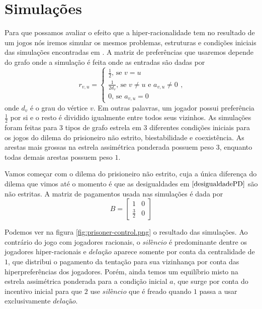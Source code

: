 \chapter{Simulações}

Para que possamos avaliar o efeito que a hiper-racionalidade tem no resultado de um jogos nós iremos simular os mesmos problemas, estruturas e condições iniciais das simulações encontradas em \cite{madeo2015}. A matriz de preferências que usaremos depende do grafo onde a simulação é feita onde as entradas são dadas por
\begin{equation}
    \label{prefComparativo}
    r_{v,u} = \left\{\begin{matrix}
                \frac{1}{2} \text{, se } v=u\\ 
                \frac{1}{2d_v} \text{, se } v\neq u \text{ e } a_{v,u}\neq 0 \\
                 0 \text{, se } a_{v,u}=0
                \end{matrix}\right.,
\end{equation}
onde $d_v$ é o grau do vértice $v$. Em outras palavras, um jogador possui preferência $\frac{1}{2}$ por si e o resto é dividido igualmente entre todos seus vizinhos. As simulações foram feitas para $3$ tipos de grafo estrela em $3$ diferentes condições iniciais para os jogos do dilema do prisioneiro não estrito, biestabilidade e coexistência. As arestas mais grossas na estrela assimétrica ponderada possuem peso $3$, enquanto todas demais arestas possuem peso $1$. 

Vamos começar com o dilema do prisioneiro não estrito, cuja a única diferença do dilema que vimos até o momento é que as desigualdades em $\eqref{desigualdadePD}$ são não estritas. A matriz de pagamentos usada nas simulações é dada por
\begin{equation}
    \label{pagtoPDComparativo}
    B=
    \begin{bmatrix}
        1 & 0\\ 
        \frac{3}{2} & 0 
    \end{bmatrix}
\end{equation}

Podemos ver na figura \ref{fig:prisoner-control.png} o resultado das simulações. Ao contrário do jogo com jogadores racionais, o $\textit{silêncio}$ é predominante dentre os jogadores hiper-racionais e $\textit{delação}$ aparece somente por conta da centralidade de $1$, que distribui o pagamento da tentação para sua vizinhança por conta das hiperpreferências dos jogadores. Porém, ainda temos um equilíbrio misto na estrela assimétrica ponderada para a condição inicial $a$, que surge por conta do incentivo inicial para que $2$ use $\textit{silêncio}$ que é freado quando $1$ passa a usar exclusivamente $\textit{delação}$.

